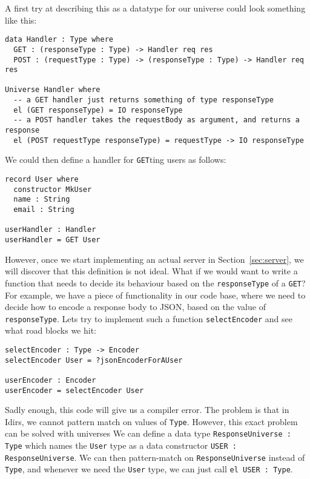 \documentclass[12pt,a4paper]{article}
\begin{document}
A first try at describing this as a datatype for our universe  could look something like this:
\begin{listing}
  \begin{verbatim}
data Handler : Type where
  GET : (responseType : Type) -> Handler req res
  POST : (requestType : Type) -> (responseType : Type) -> Handler req res

Universe Handler where
  -- a GET handler just returns something of type responseType
  el (GET responseType) = IO responseType
  -- a POST handler takes the requestBody as argument, and returns a response
  el (POST requestType responseType) = requestType -> IO responseType

  \end{verbatim}
\end{listing}

We could then define a handler for \texttt{GET}ting users as follows:
\begin{verbatim}
record User where
  constructor MkUser
  name : String
  email : String

userHandler : Handler
userHandler = GET User
\end{verbatim}

However, once we start implementing an actual server in Section~\ref{sec:server}, we will discover that this definition is not ideal. What if we would want to write a function that needs to decide its behaviour based on the \texttt{responseType} of a \texttt{GET}?
For example, we have a piece of functionality in our code base, where we need to decide how to encode a response body to JSON, based on the value of \texttt{responseType}. Lets try to implement such a function \texttt{selectEncoder} and see what road blocks we hit:

\begin{verbatim}
selectEncoder : Type -> Encoder
selectEncoder User = ?jsonEncoderForAUser

userEncoder : Encoder
userEncoder = selectEncoder User
\end{verbatim}

Sadly enough, this code will give us a compiler error. The problem is that in Idirs, we cannot pattern match on values of \texttt{Type}. 
However, this exact problem can be solved with universes We can define a data type \texttt{ResponseUniverse : Type} which names
the \texttt{User} type as a data constructor \texttt{USER : ResponseUniverse}. We can then pattern-match on \texttt{ResponseUniverse} instead of \texttt{Type}, and whenever we need the \texttt{User} type, we can just call \texttt{el USER : Type}.
\end{document}
